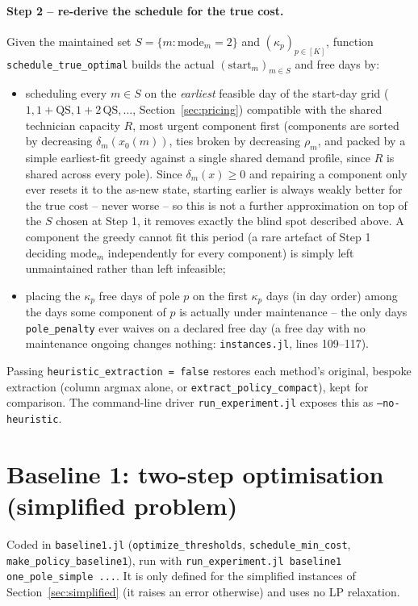 \documentclass[11pt]{article}
\begin{document}
\paragraph{Step 2 -- re-derive the schedule for the true cost.} Given the maintained set
$S = \{m : \mathrm{mode}_m = 2\}$ and $(\kappa_p)_{p\in[K]}$, function
\texttt{schedule\_true\_optimal} builds the actual $(\mathrm{start}_m)_{m\in S}$ and free
days by:
\begin{itemize}
  \item scheduling every $m \in S$ on the \emph{earliest} feasible day of the start-day grid
  ($1, 1+\mathrm{QS}, 1+2\,\mathrm{QS}, \dots$, Section~\ref{sec:pricing}) compatible with
  the shared technician capacity $R$, most urgent component first (components are sorted
  by decreasing $\delta_m(x_0(m))$, ties broken by decreasing $\rho_m$, and packed by a
  simple earliest-fit greedy against a single shared demand profile, since $R$ is shared
  across every pole). Since $\delta_m(x) \ge 0$ and repairing a component only ever resets
  it to the as-new state, starting earlier is always weakly better for the true cost --
  never worse -- so this is not a further approximation on top of the $S$ chosen at Step 1,
  it removes exactly the blind spot described above. A component the greedy cannot fit this
  period (a rare artefact of Step 1 deciding $\mathrm{mode}_m$ independently for every
  component) is simply left unmaintained rather than left infeasible;
  \item placing the $\kappa_p$ free days of pole $p$ on the first $\kappa_p$ days (in day
  order) among the days some component of $p$ is actually under maintenance -- the only
  days \texttt{pole\_penalty} ever waives on a declared free day (a free day with no
  maintenance ongoing changes nothing: \texttt{instances.jl}, lines 109--117).
\end{itemize}

Passing \texttt{heuristic\_extraction = false} restores each method's original, bespoke
extraction (column argmax alone, or \texttt{extract\_policy\_compact}), kept for comparison.
The command-line driver \texttt{run\_experiment.jl} exposes this as \texttt{--no-heuristic}.

\section{Baseline 1: two-step optimisation (simplified problem)}
\label{sec:baseline1}

Coded in \texttt{baseline1.jl} (\texttt{optimize\_thresholds}, \texttt{schedule\_min\_cost},
\texttt{make\_policy\_baseline1}), run with \texttt{run\_experiment.jl baseline1
one\_pole\_simple ...}. It is only defined for the simplified instances of
Section~\ref{sec:simplified} (it raises an error otherwise) and uses no LP relaxation.
\end{document}
